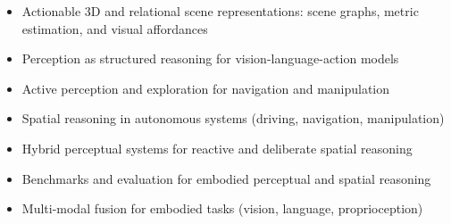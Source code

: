 \documentclass[runningheads]{llncs}
\begin{document}
\vspace{-1.5em}

\begin{itemize}
    \item Actionable 3D and relational scene representations: scene graphs, metric estimation, and visual affordances
    \item Perception as structured reasoning for vision-language-action models
    \item Active perception and exploration for navigation and manipulation
    \item Spatial reasoning in autonomous systems (driving, navigation, manipulation)
    \item Hybrid perceptual systems for reactive and deliberate spatial reasoning
    \item Benchmarks and evaluation for embodied perceptual and spatial reasoning
    \item Multi-modal fusion for embodied tasks (vision, language, proprioception)
\end{itemize}
\end{document}
